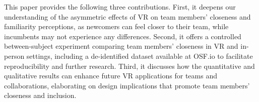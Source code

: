 This paper provides the following three contributions. First, it deepens our understanding of the asymmetric effects of VR on team members' closeness and familiarity perceptions, as newcomers can feel closer to their team, while incumbents may not experience any differences. Second, it offers a controlled between-subject experiment comparing team members' closeness in VR and in-person settings, including a de-identified dataset available at OSF.io \cite{Gomez-Zara_2025} to facilitate reproducibility and further research. Third, it discusses how the quantitative and qualitative results can enhance future VR applications for teams and collaborations, elaborating on design implications that promote team members' closeness and inclusion.

